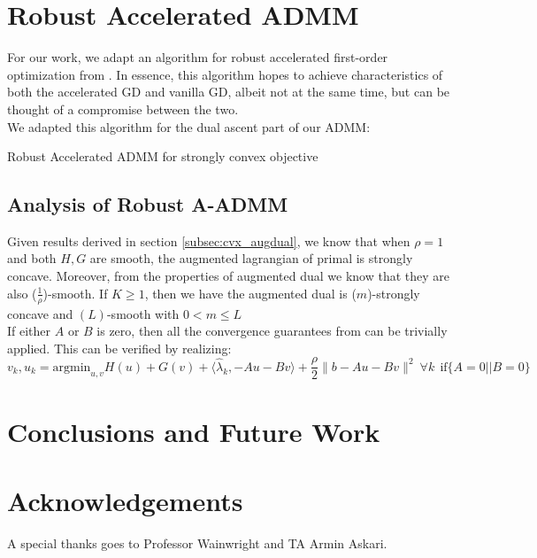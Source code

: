 \documentclass[11pt]{article}
\theoremstyle{plain}
\theoremstyle{definition}
\theoremstyle{remark}
\begin{document}
\section{Robust Accelerated ADMM}
\label{sec:robust_aadmm}
For our work, we adapt an algorithm for robust accelerated first-order optimization from \cite{cyrus2018robust}. In essence, this algorithm hopes to achieve characteristics of both the accelerated GD and vanilla GD, albeit not at the same time, but can be thought of a compromise between the two.\\
We adapted this algorithm for the dual ascent part of our ADMM:
\begin{algorithm}

    \caption{Robust Accelerated ADMM for strongly convex objective}
\end{algorithm}

\subsection{Analysis of Robust A-ADMM}
Given results derived in section \ref{subsec:cvx_augdual}, we know that when $\rho=1$ and both $H,G$ are smooth, the augmented lagrangian of primal is strongly concave. Moreover, from the properties of augmented dual we know that they are also ($\frac{1}{\rho}$)-smooth. If $K \geq 1$, then we have the augmented dual is ($m$)-strongly concave and $(L)$-smooth with $0 < m \leq L$\\
If either $A$ or $B$ is zero, then all the convergence guarantees from 
\cite{cyrus2018robust} can be trivially applied. This can be verified by realizing:
\begin{equation}
	v_k,u_k = \text{argmin}_{u,v} H(u) + G(v) + \langle \hat \lambda_k, -Au-Bv \rangle +\frac{\rho}{2}\|b-Au-Bv\|^2  \ \forall k \ \ \text{if} \{A=0 || B=0\}
\end{equation}

\section{Conclusions and Future Work}
\label{sec: conclusions_and_future_work}


\section*{Acknowledgements}
A special thanks goes to Professor Wainwright and TA Armin Askari.



\end{document}
